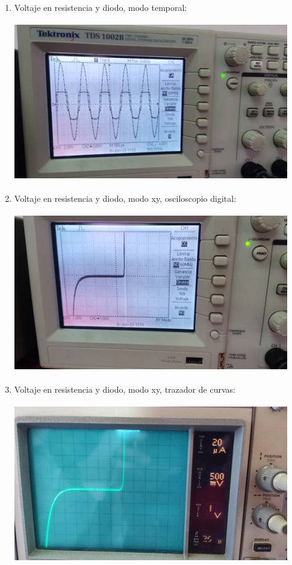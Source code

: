 \documentclass[12pt]{article}
\begin{document}
	\begin{enumerate}
		\item Voltaje en resistencia y diodo, modo temporal:
		
		\includegraphics[width=12cm,height=7cm]{Img/lab_5_img_6}
		
		\item Voltaje en resistencia y diodo, modo xy, osciloscopio digital:
		
		\includegraphics[width=12cm,height=7cm]{Img/lab_5_img_7}
		
		\item Voltaje en resistencia y diodo, modo xy, trazador de curvas:
		
		\includegraphics[width=12cm,height=7cm]{Img/lab_5_img_9}
		

\end{enumerate}
\end{document}

